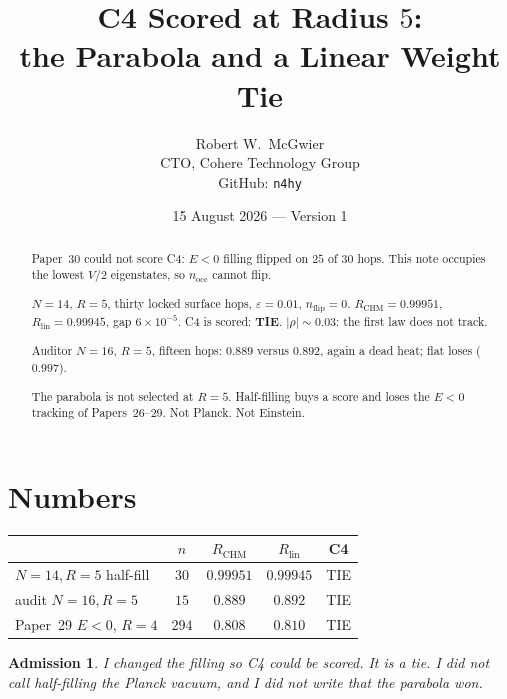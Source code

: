 \documentclass[11pt]{article}
\title{\textbf{C4 Scored at Radius $5$:\\
the Parabola and a Linear Weight Tie}}
\author{Robert W.\ McGwier\\
\small CTO, Cohere Technology Group\\
\small GitHub: \texttt{n4hy}}
\date{15 August 2026 --- Version 1}
\newtheorem*{admission}{Admission}
\begin{document}
\maketitle

\begin{abstract}
\noindent
Paper~30 could not score C4: $E<0$ filling flipped on $25$ of
$30$ hops. This note occupies the lowest $V/2$ eigenstates, so
$n_{\mathrm{occ}}$ cannot flip.

$N=14$, $R=5$, thirty locked surface hops, $\varepsilon=0.01$,
$n_{\mathrm{flip}}=0$.
$R_{\mathrm{CHM}}=0.99951$, $R_{\mathrm{lin}}=0.99945$,
gap $6\times 10^{-5}$. C4 is scored: \textbf{TIE}.
$\lvert\rho\rvert\sim 0.03$: the first law does not track.

Auditor $N=16$, $R=5$, fifteen hops: $0.889$ versus $0.892$,
again a dead heat; flat loses ($0.997$).

The parabola is not selected at $R=5$. Half-filling buys a
score and loses the $E<0$ tracking of Papers~26--29.
Not Planck. Not Einstein.
\end{abstract}

\section{Numbers}

\begin{center}
\begin{tabular}{lcccc}
\hline
 & $n$ & $R_{\mathrm{CHM}}$ & $R_{\mathrm{lin}}$ & C4 \\
\hline
$N=14,R=5$ half-fill & $30$ & $0.99951$ & $0.99945$ & TIE \\
audit $N=16,R=5$ & $15$ & $0.889$ & $0.892$ & TIE \\
Paper~29 $E<0$, $R=4$ & $294$ & $0.808$ & $0.810$ & TIE \\
\hline
\end{tabular}
\end{center}

\begin{admission}
I changed the filling so C4 could be scored. It is a tie. I did
not call half-filling the Planck vacuum, and I did not write
that the parabola won.
\end{admission}
\end{document}

